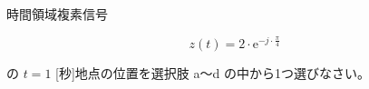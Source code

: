 時間領域複素信号 

\[
z(t) = 2 \cdot \textrm{e}^{ -j \cdot \frac{\pi}{4} }
\]

\medskip
\noindent の $t = 1$ [秒]地点の位置を選択肢 a〜d の中から1つ選びなさい。
